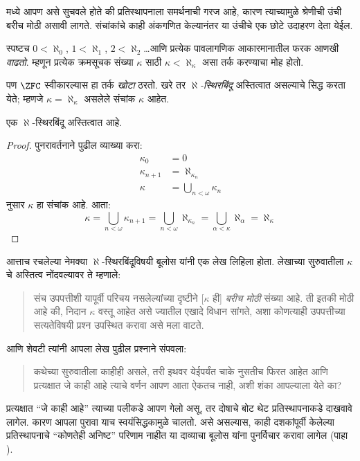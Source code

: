 \documentclass[../../../include/open-logic-section]{subfiles}
\begin{document}

 मध्ये आपण असे सुचवले होते की प्रतिस्थापनाला समर्थनाची गरज आहे, कारण त्याच्यामुळे श्रेणीची उंची बरीच मोठी असावी लागते. संचांकांचे काही अंकगणित केल्यानंतर या उंचीचे एक छोटे उदाहरण देता येईल.

स्पष्टच $0 < \aleph_0$, $1 < \aleph_1$, $2 < \aleph_2$\ldots आणि प्रत्येक पावलागणिक आकारमानातील फरक आणखी \emph{वाढतो}. म्हणून प्रत्येक क्रमसूचक संख्या $\kappa$ साठी $\kappa< \aleph_\kappa$ असा तर्क करण्याचा मोह होतो.

पण $\ZFC$ स्वीकारल्यास हा तर्क \emph{खोटा} ठरतो. खरे तर \emph{$\aleph$-स्थिरबिंदू} अस्तित्वात असल्याचे सिद्ध करता येते; म्हणजे $\kappa=\aleph_\kappa$ असलेले संचांक $\kappa$ आहेत.

\begin{prop}
एक $\aleph$-स्थिरबिंदू अस्तित्वात आहे.
\end{prop}

\begin{proof}
पुनरावर्तनाने पुढील व्याख्या करा:
\begin{align*}
	\kappa_0 &= 0\\
	\kappa_{n+1} &= \aleph_{\kappa_n}\\
	\kappa&= \bigcup_{n < \omega}\kappa_n
\end{align*}
 नुसार $\kappa$ हा संचांक आहे. आता:
\[
	\kappa= \bigcup_{n < \omega} \kappa_{n+1} =
	\bigcup_{n < \omega}\aleph_{\kappa_n} =
	\bigcup_{\alpha < \kappa}\aleph_\alpha = \aleph_\kappa
\]
\end{proof}

आत्ताच रचलेल्या नेमक्या $\aleph$-स्थिरबिंदूविषयी बूलोस यांनी एक लेख लिहिला होता. लेखाच्या सुरुवातीला $\kappa$ चे अस्तित्व नोंदवल्यावर ते म्हणाले:
\begin{quote}
	संच उपपत्तीशी यापूर्वी परिचय नसलेल्यांच्या दृष्टीने [$\kappa$ ही] \emph{बरीच मोठी} संख्या आहे. ती इतकी मोठी आहे की, निदान $\kappa$ वस्तू आहेत असे ज्यातील एखादे विधान सांगते, अशा कोणत्याही उपपत्तीच्या सत्यतेविषयी प्रश्न उपस्थित करावा असे मला वाटते.
	\citep[पृ.~257]{Boolos2000}
\end{quote}
आणि शेवटी त्यांनी आपला लेख पुढील प्रश्नाने संपवला:
\begin{quote}
	कथेच्या सुरुवातीला काहीही असले, तरी इथवर येईपर्यंत चाके नुसतीच फिरत आहेत आणि प्रत्यक्षात जे काही आहे त्याचे वर्णन आपण आता ऐकतच नाही, अशी शंका आपल्याला येते का?
	\citep[पृ.~268]{Boolos2000}
\end{quote}
प्रत्यक्षात “जे काही आहे” त्याच्या पलीकडे आपण गेलो असू, तर दोषाचे बोट थेट प्रतिस्थापनाकडे दाखवावे लागेल. कारण आपला पुरावा याच स्वयंसिद्धकामुळे चालतो. असे असल्यास, काही दशकांपूर्वी केलेल्या प्रतिस्थापनाचे “कोणतेही अनिष्ट” परिणाम नाहीत या दाव्याचा बूलोस यांना पुनर्विचार करावा लागेल (पाहा ).
\end{document}
